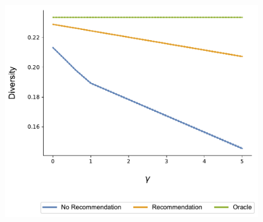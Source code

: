 \documentclass[sigconf, anonymous, review]{acmart}
\begin{document}
\begin{figure}[ht]
\includegraphics[width=.9\linewidth]{figures/gamma_diversity_N_200_T_20}
\label{fig:risk_aversion_diversity}
\end{figure}
\end{document}
